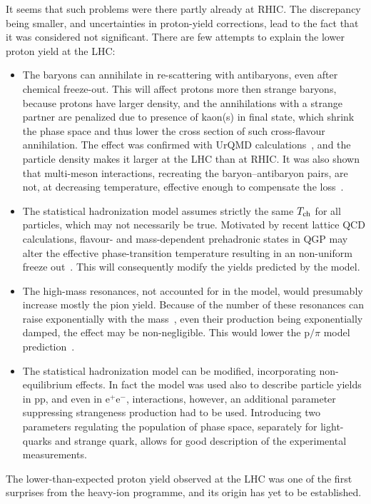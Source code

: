 It seems that such problems were there partly already at RHIC. The discrepancy being smaller, and uncertainties in proton-yield corrections, lead to the fact that it was considered not significant. There are few attempts to explain the lower proton yield at the LHC:
\begin{itemize}
\item{The baryons can annihilate in re-scattering with antibaryons, even after chemical freeze-out. This will affect protons more then strange baryons, because protons have larger density, and the annihilations with a strange partner are penalized due to presence of kaon(s) in final state, which shrink the phase space and thus lower the cross section of such cross-flavour annihilation. The effect was confirmed with UrQMD calculations~\cite{Karpenko:2012yf,Steinheimer:2012rd,Becattini:2012xb}, and the particle density makes it larger at the LHC than at RHIC. It was also shown that multi-meson interactions, recreating the baryon--antibaryon pairs, are not, at decreasing temperature, effective enough to compensate the loss~\cite{Pan:2012ne}.}
\item{The statistical hadronization model assumes strictly the same $T_{\rm ch}$ for all particles, which may not necessarily be true. Motivated by recent lattice QCD calculations, flavour- and mass-dependent prehadronic states in QGP may alter the effective phase-transition temperature resulting in an non-uniform freeze out~\cite{Ratti:2011au}. This will consequently modify the yields predicted by the model.}
\item{The high-mass resonances, not accounted for in the model, would presumably increase mostly the pion yield. Because of the number of these resonances can raise exponentially with the mass~\cite{Hagedorn:1965st,RHagedorn:1968}, even their production being exponentially damped, the effect may be non-negligible. This would lower the p$/\pi$ model prediction~\cite{Andronic:2008gu}.}
\item{The statistical hadronization model can be modified, incorporating non-equilibrium effects. In fact the model was used also to describe particle yields in pp, and even in e$^+$e$^-$, interactions, however, an additional parameter suppressing strangeness production had to be used. Introducing two parameters regulating the population of phase space, separately for light-quarks and strange quark, allows for good description of the experimental measurements.~\cite{Rafelski:2010cw,Petran:2013lja}}
\end{itemize}
The lower-than-expected proton yield observed at the LHC was one of the first surprises from the heavy-ion programme, and its origin has yet to be established.

